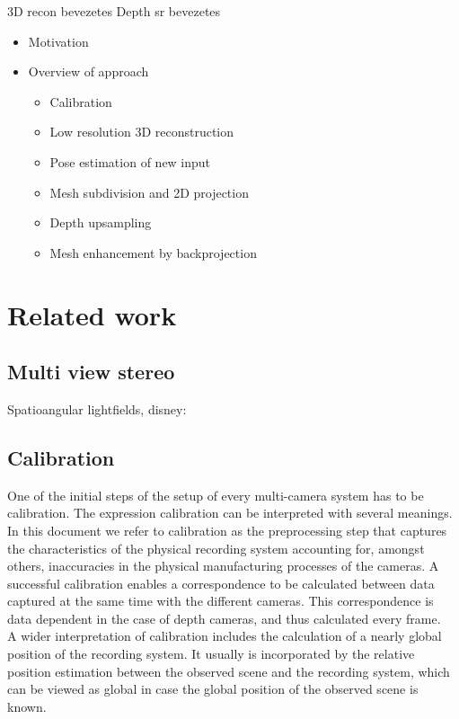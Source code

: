 \documentclass{ucl_thesis}
\begin{document}
3D recon bevezetes
Depth sr bevezetes

\label{chp:background}
	\begin{itemize}	
		\item Motivation
		\item Overview of approach
		\begin{itemize}
			\item Calibration
			\item Low resolution 3D reconstruction
			\item Pose estimation of new input
			\item Mesh subdivision and 2D projection
			\item Depth upsampling
			\item Mesh enhancement by backprojection
		\end{itemize}
	\end{itemize}

\chapter{Related work} 
\label{chp:related_work}

\section{Multi view stereo}
\label{sec:mvs}
Spatioangular lightfields, disney: \citep{Kim:2013}

\section{Calibration}
\label{sec:lit_calib}

One of the initial steps of the setup of every multi-camera system has to be calibration. The expression calibration can be interpreted with several meanings. In this document we refer to calibration as the preprocessing step that captures the characteristics of the physical recording system accounting for, amongst others, inaccuracies in the physical manufacturing processes of the cameras. A successful calibration enables a correspondence to be calculated between data captured at the same time with the different cameras. This correspondence is data dependent in the case of depth cameras, and thus calculated every frame.\\

A wider interpretation of calibration includes the calculation of a nearly global position of the recording system. It usually is incorporated by the relative position estimation between the observed scene and the recording system, which can be viewed as global in case the global position of the observed scene is known. \\
\end{document}
